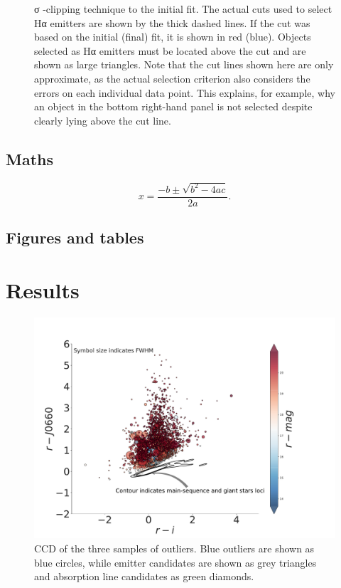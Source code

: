 \documentclass[fleqn,usenatbib]{mnras}
\begin{document}
\begin{figure}
{σ -clipping technique to the initial fit. The actual cuts used to select Hα emitters are shown by the thick dashed lines. If the cut was based on the initial (final)
fit, it is shown in red (blue). Objects selected as Hα emitters must be located above the cut and are shown as large triangles. Note that the cut lines shown here
are only approximate, as the actual selection criterion also considers the errors on each individual data point. This explains, for example, why an object in the bottom right-hand panel is not selected despite clearly lying above the cut line.}
  \label{fig:color-diagram}
\end{figure}


\subsection{Maths}
\label{sec:maths} %


\begin{equation}

    x=\frac{-b\pm\sqrt{b^2-4ac}}{2a}.
	\label{eq:quadratic}
\end{equation}


\subsection{Figures and tables}

\section{Results}
\label{sec:results}

\begin{figure}
	\includegraphics[width=0.9\linewidth]{Figs/final-emitters.pdf}
    \caption{CCD of the three samples of outliers. Blue outliers are shown as blue circles, while emitter candidates are shown as grey triangles and absorption
line candidates as green diamonds.}
    \label{fig:emission}
\end{figure}
\end{document}
